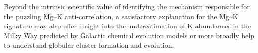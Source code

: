 \documentclass[a4paper,fleqn,usenatbib]{mnras}
\providecommand{\DIFaddtex}[1]{{\protect\color{blue}\uwave{#1}}} %
\providecommand{\DIFaddbegin}{} %
\providecommand{\DIFaddend}{} %
\providecommand{\DIFdelbegin}{} %
\providecommand{\DIFdelend}{} %
\providecommand{\DIFadd}[1]{\texorpdfstring{\DIFaddtex{#1}}{#1}} %
\newcommand{\DIFscaledelfig}{0.5}
\newlength{\DIFdelgraphicswidth} %
\newlength{\DIFdelgraphicsheight} %
\newcommand{\DIFaddincludegraphics}[2][]{{\color{blue}\fbox{\DIFOincludegraphics[#1]{#2}}}} %
\newcommand{\DIFdelincludegraphics}[2][]{%
\sbox{\DIFdelgraphicsbox}{\DIFOincludegraphics[#1]{#2}}%
\settoboxwidth{\DIFdelgraphicswidth}{\DIFdelgraphicsbox} %
\settoboxtotalheight{\DIFdelgraphicsheight}{\DIFdelgraphicsbox} %
\scalebox{\DIFscaledelfig}{%
\parbox[b]{\DIFdelgraphicswidth}{\usebox{\DIFdelgraphicsbox}\\[-\baselineskip] \rule{\DIFdelgraphicswidth}{0em}}\llap{\resizebox{\DIFdelgraphicswidth}{\DIFdelgraphicsheight}{%
\setlength{\unitlength}{\DIFdelgraphicswidth}%
\begin{picture}(1,1)%
\thicklines\linethickness{2pt} %
{\color[rgb]{1,0,0}\put(0,0){\framebox(1,1){}}}%
{\color[rgb]{1,0,0}\put(0,0){\line( 1,1){1}}}%
{\color[rgb]{1,0,0}\put(0,1){\line(1,-1){1}}}%
\end{picture}%
}\hspace*{3pt}}} %
} %
\DeclareRobustCommand{\DIFaddbegin}{\DIFOaddbegin \let\includegraphics\DIFaddincludegraphics} %
\DeclareRobustCommand{\DIFaddend}{\DIFOaddend \let\includegraphics\DIFOincludegraphics} %
\DeclareRobustCommand{\DIFdelbegin}{\DIFOdelbegin \let\includegraphics\DIFdelincludegraphics} %
\DeclareRobustCommand{\DIFdelend}{\DIFOaddend \let\includegraphics\DIFOincludegraphics} %
\begin{document}
\DIFdelbegin %



\DIFdelend Beyond the intrinsic scientific value of identifying the mechanism responsible for the puzzling Mg--K anti-correlation, a satisfactory explanation for the Mg--K signature may also offer insight into the underestimation of K abundances in the Milky Way predicted by Galactic chemical evolution models \citep{kobayashi2011}\DIFaddbegin \DIFadd{, }\DIFaddend or more broadly help to understand globular cluster formation and evolution. 
\end{document}
